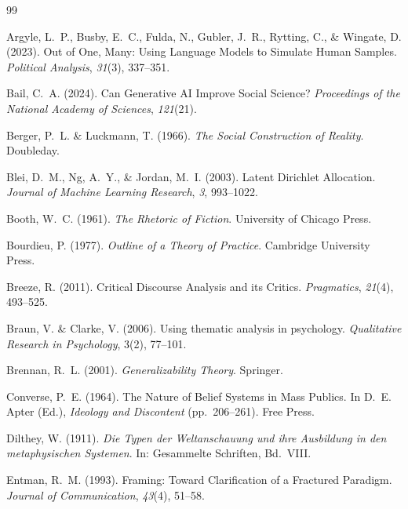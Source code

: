 \documentclass[11pt,a4paper]{article}
\theoremstyle{definition}
\theoremstyle{plain}
\theoremstyle{remark}
\begin{document}
\begin{thebibliography}{99}

  Argyle, L.~P., Busby, E.~C., Fulda, N., Gubler, J.~R., Rytting, C., \& Wingate, D. (2023).
  Out of One, Many: Using Language Models to Simulate Human Samples.
  \textit{Political Analysis}, \textit{31}(3), 337--351.

  Bail, C.~A. (2024).
  Can Generative AI Improve Social Science?
  \textit{Proceedings of the National Academy of Sciences}, \textit{121}(21).

  Berger, P.~L. \& Luckmann, T. (1966).
  \textit{The Social Construction of Reality}.
  Doubleday.

  Blei, D.~M., Ng, A.~Y., \& Jordan, M.~I. (2003).
  Latent Dirichlet Allocation.
  \textit{Journal of Machine Learning Research}, \textit{3}, 993--1022.

  Booth, W.~C. (1961).
  \textit{The Rhetoric of Fiction}.
  University of Chicago Press.

  Bourdieu, P. (1977).
  \textit{Outline of a Theory of Practice}.
  Cambridge University Press.

  Breeze, R. (2011).
  Critical Discourse Analysis and its Critics.
  \textit{Pragmatics}, \textit{21}(4), 493--525.

  Braun, V. \& Clarke, V. (2006).
  Using thematic analysis in psychology.
  \textit{Qualitative Research in Psychology}, 3(2), 77--101.

  Brennan, R.~L. (2001).
  \textit{Generalizability Theory}.
  Springer.

  Converse, P.~E. (1964).
  The Nature of Belief Systems in Mass Publics.
  In D.~E. Apter (Ed.), \textit{Ideology and Discontent} (pp.~206--261).
  Free Press.

  Dilthey, W. (1911).
  \textit{Die Typen der Weltanschauung und ihre Ausbildung in den metaphysischen Systemen}.
  In: Gesammelte Schriften, Bd.~VIII.

  Entman, R.~M. (1993).
  Framing: Toward Clarification of a Fractured Paradigm.
  \textit{Journal of Communication}, \textit{43}(4), 51--58.


\end{thebibliography}
\end{document}
